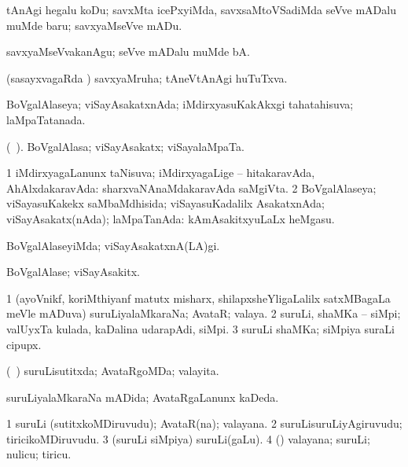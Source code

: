\bentry
{} 
\gl{\sakirx}
\expl{}
\bmng
 tAnAgi hegalu koDu; savxMta icePxyiMda, savxsaMtoVSadiMda seVve mADalu muMde baru; savxyaMseVve mADu. 
\emng

\noindent 
\gl{\akirx}
\expl{}
\bmng
 savxyaMseVvakanAgu; seVve mADalu muMde bA. 
\emng
\eentry

\bentry 
{} 
\gl{\gu}
\expl{}
\bmng
 (sasayxvagaRda \vi) savxyaMruha; tAneVtAnAgi huTuTxva. 
\emng
\eentry

\bentry 
{} 
\gl{\gu}
\expl{}
\bmng
 BoVgalAlaseya; viSayAsakatxnAda; iMdirxyasuKakAkxgi tahatahisuva; laMpaTatanada. 
\emng
\eentry

\bentry 
{} 
\gl{\nA}(\bava\ ). 
\bmng
 BoVgalAlasa; viSayAsakatx; viSayalaMpaTa. 
\emng
\eentry

\bentry 
{} 
\gl{\gu}
\expl{}
\bmng
\bnum
\num{1} iMdirxyagaLanunx taNisuva; iMdirxyagaLige -- hitakaravAda, AhAlxdakaravAda:  sharxvaNAnaMdakaravAda saMgiVta. 
\num{2} BoVgalAlaseya; viSayasuKakekx saMbaMdhisida; viSayasuKadalilx AsakatxnAda; viSayAsakatx(nAda); laMpaTanAda:  kAmAsakitxyuLaLx heMgasu. 
\enum
\emng
\eentry

\bentry 
{} 
\gl{\kirxvi}
\expl{}
\bmng
 BoVgalAlaseyiMda; viSayAsakatxnA(LA)gi. 
\emng
\eentry

\bentry 
{} 
\gl{\nA}
\expl{}
\bmng
 BoVgalAlase; viSayAsakitx. 
\emng
\eentry

\bentry
{} 
\gl{\nA}
\expl{}
\bmng
\bnum
\num{1} (ayoVnikf, koriMthiyanf matutx misharx, shilapxsheYligaLalilx satxMBagaLa meVle mADuva) suruLiyalaMkaraNa; AvataR; valaya. 
\num{2} suruLi, shaMKa -- siMpi; valUyxTa kulada, kaDalina udarapAdi, siMpi. 
\num{3} suruLi shaMKa; siMpiya suraLi cipupx. 
\enum
\emng
\eentry

\bentry
{} 
\gl{\gu}
\expl{}
\bmng
 (\kanmu\ \savi) suruLisutitxda; AvataRgoMDa; valayita. 
\emng
\eentry

\bentry 
{} 
\gl{\gu}
\expl{}
\bmng
suruLiyalaMkaraNa mADida; AvataRgaLanunx kaDeda. 
\emng
\eentry

\bentry 
{} 
\gl{\nA}
\expl{}
\bmng
\bnum
\num{1} suruLi (sutitxkoMDiruvudu); AvataR(na); valayana. 
\num{2} suruLisuruLiyAgiruvudu; tiricikoMDiruvudu. 
\num{3} (suruLi siMpiya) suruLi(gaLu). 
\num{4} (\aMrashA) valayana; suruLi; nulicu; tiricu. 
\enum
\emng
\eentry


